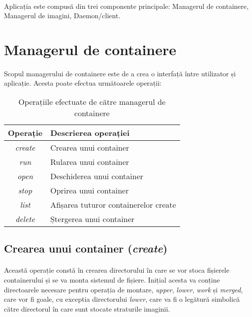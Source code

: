     \paragraph{} Aplicația este compusă din trei componente principale: Managerul de containere, Managerul de imagini, Daemon/client.

    \pagebreak
    \section{Managerul de containere}
        \paragraph{} Scopul managerului de containere este de a crea o interfață între utilizator și aplicație. Acesta poate efectua următoarele operații:
        \begin{table}[h!]
            \centering
            \begin{tabular}{ |c|l| }
                \hline
                \textbf{Operație} & \textbf{Descrierea operației}  \\
                \hline
                \textit{create} & Crearea unui container  \\
                \hline
                \textit{run}    & Rularea unui container  \\
                \hline
                \textit{open}   & Deschiderea unui container  \\
                \hline
                \textit{stop}   & Oprirea unui container  \\
                \hline
                \textit{list}   & Afișarea tuturor containerelor create  \\
                \hline
                \textit{delete} & Ștergerea unui container  \\
                \hline
            \end{tabular}
            \caption{Operațiile efectuate de către managerul de containere}
            \label{table:cmop}
        \end{table}

        \subsection{Crearea unui container (\textit{create})}
            \paragraph{} Această operație constă în crearea directorului în care se vor stoca fișierele containerului și se va monta sistemul de fișiere. Inițial acesta va conține directoarele necesare pentru operația de montare, \textit{upper}, \textit{lower}, \textit{work} și \textit{merged}, care vor fi goale, cu exceptia directorului \textit{lower}, care va fi o legătură simbolică către directorul în care sunt stocate straturile imaginii.
